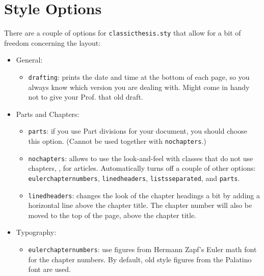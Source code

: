 \section{Style Options}\label{sec:options}
There are a couple of options for \texttt{classicthesis.sty} that
allow for a bit of freedom concerning the layout:
\begin{itemize}
    \item General:
        \begin{itemize}
            \item\texttt{drafting}: prints the date and time at the bottom of
            each page, so you always know which version you are dealing with.
            Might come in handy not to give your Prof. that old draft.
        \end{itemize}
    
    \item Parts and Chapters:
        \begin{itemize}
            \item\texttt{parts}: if you use Part divisions for your document,
            you should choose this option. (Cannot be used together with
            \texttt{nochapters}.)
            
            \item\texttt{nochapters}: allows to use the look-and-feel with
            classes that do not use chapters, \eg, for articles. Automatically
            turns off a couple of other options: \texttt{eulerchapternumbers},
            \texttt{linedheaders}, \texttt{listsseparated}, and \texttt{parts}.
            
            \item\texttt{linedheaders}: changes the look of the chapter
            headings a bit by adding a horizontal line above the chapter
            title. The chapter number will also be moved to the top of the
            page, above the chapter title.
            
        \end{itemize}
    
    \item Typography:
        \begin{itemize}
            \item\texttt{eulerchapternumbers}: use figures from Hermann Zapf's
            Euler math font for the chapter numbers. By default, old style
            figures from the Palatino font are used.
            

\end{itemize}
\end{itemize}
